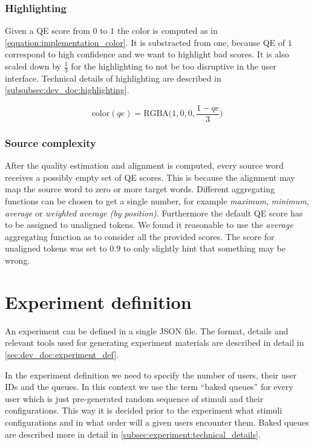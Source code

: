 \subsubsection{Highlighting} 

Given a QE score from $0$ to $1$ the color is computed as in \cref{equation:implementation_color}. It is substracted from one, because QE of $1$ correspond to high confidence and we want to highlight bad scores. It is also scaled down by $\frac{1}{3}$ for the highlighting to not be too disruptive in the user interface. Technical details of highlighting are described in \cref{subsubsec:dev_doc:highlighting}.

\begin{equation}
        \text{color}(qe) = \text{RGBA}\big(1, 0, 0, \frac{1-qe}{3}\big)
    \label{equation:implementation_color}
\end{equation}

\subsubsection{Source complexity} \label{subsubsec:impl:source_complexity}

After the quality estimation and alignment is computed, every source word receives a possibly empty set of QE scores. This is because the alignment may map the source word to zero or more target words. Different aggregating functions can be chosen to get a single number, for example \textit{maximum}, \textit{minimum}, \textit{average} or \textit{weighted average (by position)}. Furthermore the default QE score has to be assigned to unaligned tokens. We found it reasonable to use the \textit{average} aggregating function as to consider all the provided scores. The score for unaligned tokens was set to $0.9$ to only slightly hint that something may be wrong.

\pagebreak
\section{Experiment definition} \label{sec:experiment_def}

An experiment can be defined in a single JSON file. The format, details and relevant tools used for generating experiment materials are described in detail in \cref{sec:dev_doc:experiment_def}.

In the experiment definition we need to specify the number of users, their user IDs and the queues. In this context we use the term ``baked queues'' for every user which is just pre-generated random sequence of stimuli and their configurations. This way it is decided prior to the experiment what stimuli configurations and in what order will a given users encounter them. Baked queues are described more in detail in \cref{subsec:experiment:technical_details}.

